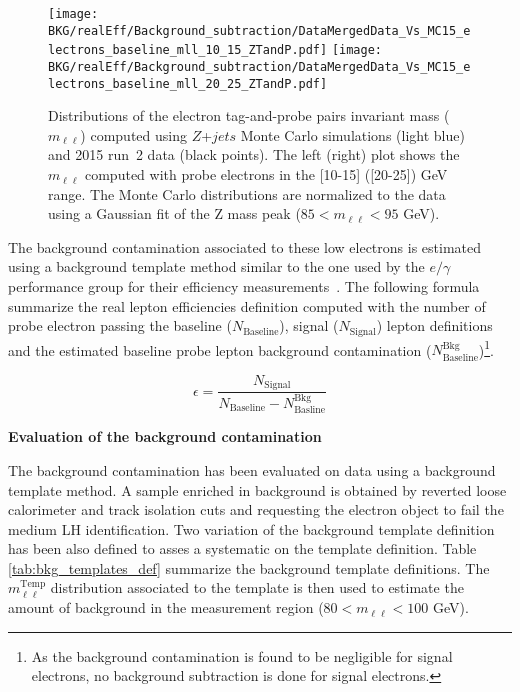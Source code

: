      \begin{figure}[!htb]
	  \begin{center} 
	   \texttt{[image: BKG/realEff/Background\_subtraction/DataMergedData\_Vs\_MC15\_electrons\_baseline\_mll\_10\_15\_ZTandP.pdf]}
	   \texttt{[image: BKG/realEff/Background\_subtraction/DataMergedData\_Vs\_MC15\_electrons\_baseline\_mll\_20\_25\_ZTandP.pdf]} 
	   \caption{\label{fig:Data_Vs_MC_mll_distributions} Distributions of the electron tag-and-probe pairs invariant mass ($m_{\ell\ell}$) computed using $Z$+$jets$ Monte Carlo simulations (light blue) and 2015 run~2 data (black points). The left (right) plot shows the $m_{\ell\ell}$ computed with probe electrons in the [10-15] ([20-25]) GeV \pt range. The Monte Carlo distributions are normalized to the data using a Gaussian fit of the Z mass peak ($85 < m_{\ell\ell} < 95$ GeV).}
	  \end{center}
	\end{figure}	

The background contamination associated to these low \pt electrons is estimated using a background template method similar to the one used by the $e/\gamma$ performance group for their efficiency measurements~\cite{ATLAS-CONF-2014-018}. The following formula summarize the real lepton efficiencies definition computed with the number of probe electron passing the baseline ($N_{\mathrm{Baseline}}$), signal ($N_{\mathrm{Signal}}$) lepton definitions and the estimated baseline probe lepton background contamination ($N^{\mathrm{Bkg}}_{\mathrm{Baseline}}$)\footnote{As the background contamination is found to be negligible for signal electrons, no background subtraction is done for signal electrons.}.

                                    $$ \epsilon = \frac{ N_{\mathrm{Signal}} }{ N_{\mathrm{Baseline}} - N^{\mathrm{Bkg}}_{\mathrm{Basline}} } $$  
 

\par{\bf Evaluation of the background contamination\\}

        The background contamination has been evaluated on data using a background template method. A sample enriched in background is obtained by reverted loose calorimeter and track isolation cuts and requesting the electron object to fail the medium LH identification. Two variation of the background template definition has been also defined to asses a systematic on the template definition. Table \ref{tab:bkg_templates_def} summarize the background template definitions. The $m_{\ell\ell}^{\mathrm{Temp}}$ distribution associated to the template is then used to estimate the amount of background in the measurement region ($80 < m_{\ell\ell} < 100$ GeV). \\


